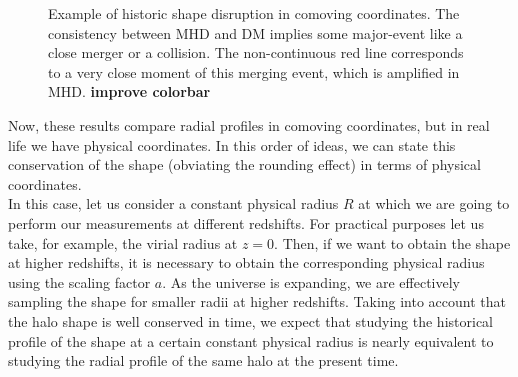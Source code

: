\begin{figure}[!ht]
  \centering
  \hfill
  \caption{Example of historic shape disruption in comoving coordinates. The consistency between MHD and DM implies some major-event like a close merger or a collision. The non-continuous red line corresponds to a very close moment of this merging event, which is amplified in MHD.  \textbf{improve colorbar}}
\end{figure}

Now, these results compare radial profiles in comoving coordinates, but in real life we have physical coordinates. In this order of ideas, we can state this conservation of the shape (obviating the rounding effect) in terms of physical coordinates.\\

In this case, let us consider a constant physical radius $R$ at which we are going to perform our measurements at different redshifts. For practical purposes let us take, for example, the virial radius at $z=0$. Then, if we want to obtain the shape at higher redshifts, it is necessary to obtain the corresponding physical radius using the scaling factor $a$. As the universe is expanding, we are effectively sampling the shape for smaller radii at higher redshifts. Taking into account that the halo shape is well conserved in time, we expect that studying the historical profile of the shape at a certain constant physical radius is nearly equivalent to studying the radial profile of the same halo at the present time. \\


